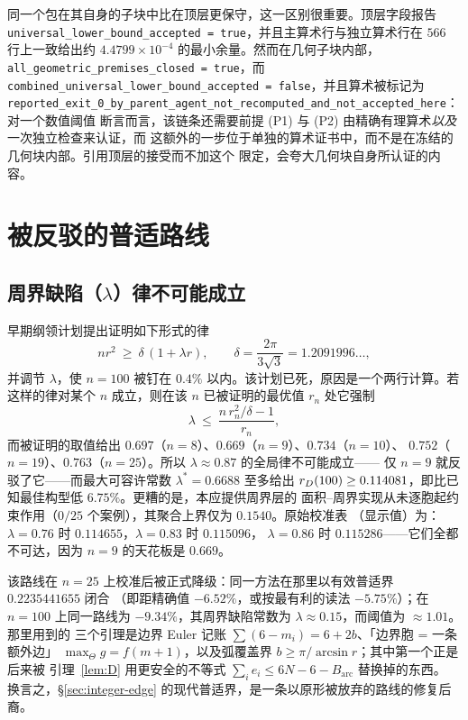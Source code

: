 \begin{remark}
同一个包在其自身的子块中比在顶层更保守，这一区别很重要。顶层字段报告
\texttt{universal\_\allowbreak{}lower\_\allowbreak{}bound\_\allowbreak{}accepted = true}，并且主算术行与独立算术行在 $566$ 行上一致给出约
$4.4799\times10^{-4}$ 的最小余量。然而在几何子块内部，
\texttt{all\_\allowbreak{}geometric\_\allowbreak{}premises\_\allowbreak{}closed = true}，而
\texttt{combined\_\allowbreak{}universal\_\allowbreak{}lower\_\allowbreak{}bound\_\allowbreak{}accepted = false}，并且算术被标记为
\texttt{reported\_\allowbreak{}exit\_\allowbreak{}0\_\allowbreak{}by\_\allowbreak{}parent\_\allowbreak{}agent\_\allowbreak{}not\_\allowbreak{}recomputed\_\allowbreak{}and\_\allowbreak{}not\_\allowbreak{}accepted\_\allowbreak{}here}：对一个数值阈值
断言而言，该链条还需要前提 (P1) 与 (P2) 由精确有理算术\emph{以及}一次独立检查来认证，而
这额外的一步位于单独的算术证书中，而不是在冻结的几何块内部。引用顶层的接受而不加这个
限定，会夸大几何块自身所认证的内容。
\end{remark}

\section{被反驳的普适路线}

\subsection{周界缺陷（$\lambda$）律不可能成立}

早期纲领计划提出证明如下形式的律
\[
n r^2\ \ge\ \delta\,(1+\lambda r),\qquad \delta=\frac{2\pi}{3\sqrt3}=1.2091996\ldots,
\]
并调节 $\lambda$，使 $n=100$ 被钉在 $0.4\%$ 以内。该计划已死，原因是一个两行计算。若
这样的律对某个 $n$ 成立，则在该 $n$ 已被证明的最优值 $r_n$ 处它强制
\[
\lambda\ \le\ \frac{n\,r_n^2/\delta-1}{r_n},
\]
而被证明的取值给出 $0.697$（$n=8$）、$\mathbf{0.669}$（$n=9$）、$0.734$（$n=10$）、
$0.752$（$n=19$）、$0.763$（$n=25$）。所以 $\lambda\approx0.87$ 的全局律不可能成立——
仅 $n=9$ 就反驳了它——而最大可容许常数 $\lambda^\ast=0.6688$ 至多给出
$r_{D}(100)\ge0.114081$，即比已知最佳构型低 $6.75\%$。更糟的是，本应提供周界层的
面积--周界实现从未逐胞起约束作用（$0/25$ 个案例），其聚合上界仅为 $0.1540$。原始校准表
（显示值）为：$\lambda=0.76$ 时 $0.114655$，$\lambda=0.83$ 时 $0.115096$，
$\lambda=0.86$ 时 $0.115286$——它们全都不可达，因为 $n=9$ 的天花板是 $0.669$。

该路线在 $n=25$ 上校准后被正式降级：同一方法在那里以有效普适界 $0.2235441655$ 闭合
（即距精确值 $-6.52\%$，或按最有利的读法 $-5.75\%$）；在 $n=100$ 上同一路线为
$-9.34\%$，其周界缺陷常数为 $\lambda\approx0.15$，而阈值为 $\approx1.01$。那里用到的
三个引理是边界 Euler 记账 $\sum(6-m_i)=6+2b$、「边界胞 = 一条额外边」
$\max_\Theta g=f(m+1)$，以及弧覆盖界 $b\ge\pi/\arcsin r$；其中第一个正是后来被
引理~\ref{lem:D} 用更安全的不等式 $\sum_ie_i\le6N-6-B_{\mathrm{arc}}$ 替换掉的东西。
换言之，\S\ref{sec:integer-edge} 的现代普适界，是一条以原形被放弃的路线的修复后裔。

